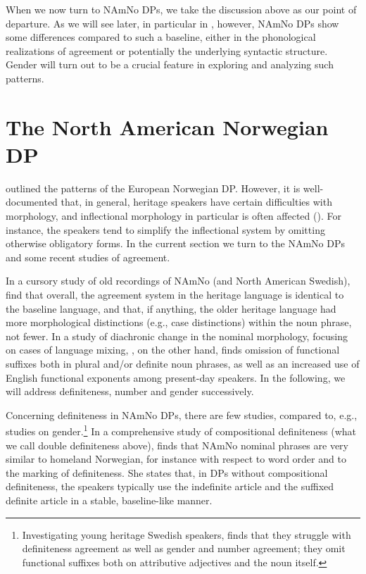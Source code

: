 \documentclass[output=paper]{langscibook}
\begin{document}
When we now turn to NAmNo DPs, we take the discussion above as our point of departure. As we will see later, in particular in , however, NAmNo DPs show some differences compared to such a baseline, either in the phonological realizations of agreement or potentially the underlying syntactic structure. Gender will turn out to be a crucial feature in exploring and analyzing such patterns. 


\section{The North American Norwegian DP}\label{sec:riksem:3} 

 outlined the patterns of the European Norwegian DP. However, it is well\hyp documented that, in general, heritage speakers have certain difficulties with morphology, and inflectional morphology in particular is often affected (\citealt{vanBaal2020, Montrul2016, ScontrasEtAl2015}). For instance, the speakers tend to simplify the inflectional system by omitting otherwise obligatory forms. In the current section we turn to the NAmNo DPs and some recent studies of agreement. 



In a cursory study of old recordings of NAmNo (and North American Swedish), \citet{JohannessenLarsson2015} find that overall, the agreement system in the heritage language is identical to the baseline language, and that, if anything, the older heritage language had more morphological distinctions (e.g., case distinctions) within the noun phrase, not fewer. In a study of diachronic change in the nominal morphology, focusing on cases of language mixing, \citet{Riksem2017}, on the other hand, finds omission of functional suffixes both in plural and/or definite noun phrases, as well as an increased use of English functional exponents among present-day speakers. In the following, we will address definiteness, number and gender successively.



Concerning definiteness in NAmNo DPs, there are few studies, compared to, e.g., studies on gender.\footnote{Investigating young heritage Swedish speakers, \citet{Håkansson1995} finds that they struggle with definiteness agreement as well as gender and number agreement; they omit functional suffixes both on attributive adjectives and the noun itself.} In a comprehensive study of compositional definiteness (what we call double definiteness above), \citet{vanBaal2020} finds that NAmNo nominal phrases are very similar to homeland Norwegian, for instance with respect to word order and to the marking of definiteness. She states that, in DPs without compositional definiteness, the speakers typically use the indefinite article and the suffixed definite article in a stable, baseline-like manner. 
\end{document}
